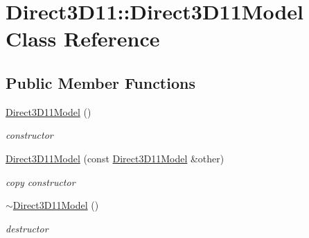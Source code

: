 \hypertarget{class_direct3_d11_1_1_direct3_d11_model}{}\section{Direct3\+D11\+:\+:Direct3\+D11\+Model Class Reference}
\label{class_direct3_d11_1_1_direct3_d11_model}
\subsection*{Public Member Functions}
\begin{DoxyCompactItemize}
\item 
\mbox{\label{class_direct3_d11_1_1_direct3_d11_model_a6b0246b46ef8187811e86f323a2bab0f}} 
\mbox{\hyperlink{class_direct3_d11_1_1_direct3_d11_model_a6b0246b46ef8187811e86f323a2bab0f}{Direct3\+D11\+Model}} ()
\begin{DoxyCompactList}\small\item\em constructor \end{DoxyCompactList}\item 
\mbox{\label{class_direct3_d11_1_1_direct3_d11_model_aa1f8029cf1eb4484c7ffa5bc6de743b0}} 
\mbox{\hyperlink{class_direct3_d11_1_1_direct3_d11_model_aa1f8029cf1eb4484c7ffa5bc6de743b0}{Direct3\+D11\+Model}} (const \mbox{\hyperlink{class_direct3_d11_1_1_direct3_d11_model}{Direct3\+D11\+Model}} \&other)
\begin{DoxyCompactList}\small\item\em copy constructor \end{DoxyCompactList}\item 
\mbox{\label{class_direct3_d11_1_1_direct3_d11_model_af52032caa6312f6fe3f7921eebea586b}} 
\mbox{\hyperlink{class_direct3_d11_1_1_direct3_d11_model_af52032caa6312f6fe3f7921eebea586b}{$\sim$\+Direct3\+D11\+Model}} ()
\begin{DoxyCompactList}\small\item\em destructor \end{DoxyCompactList}\item 
\mbox{\label{class_direct3_d11_1_1_direct3_d11_model_aaac19e83b44fb3c99efdc55306eaf977}} 

\end{DoxyCompactItemize}
